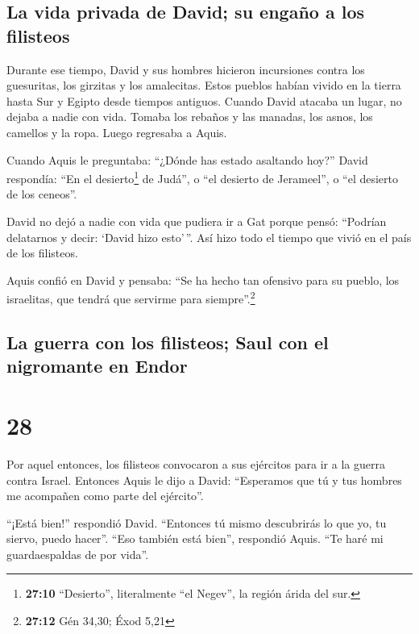 \hypertarget{la-vida-privada-de-david-su-engauxf1o-a-los-filisteos}{%
\subsection{La vida privada de David; su engaño a los
filisteos}\label{la-vida-privada-de-david-su-engauxf1o-a-los-filisteos}}

 Durante ese tiempo, David y sus hombres hicieron
incursiones contra los guesuritas, los girzitas y los amalecitas. Estos
pueblos habían vivido en la tierra hasta Sur y Egipto desde tiempos
antiguos.  Cuando David atacaba un lugar, no dejaba a
nadie con vida. Tomaba los rebaños y las manadas, los asnos, los
camellos y la ropa. Luego regresaba a Aquis.

 Cuando Aquis le preguntaba: ``¿Dónde has estado
asaltando hoy?'' David respondía: ``En el desierto\footnote{\textbf{27:10}
  ``Desierto'', literalmente ``el Negev'', la región árida del sur.} de
Judá'', o ``el desierto de Jerameel'', o ``el desierto de los ceneos''.

 David no dejó a nadie con vida que pudiera ir a Gat
porque pensó: ``Podrían delatarnos y decir: `David hizo esto'\,''. Así
hizo todo el tiempo que vivió en el país de los filisteos.

 Aquis confió en David y pensaba: ``Se ha hecho tan
ofensivo para su pueblo, los israelitas, que tendrá que servirme para
siempre''.\footnote{\textbf{27:12} Gén 34,30; Éxod 5,21}

\hypertarget{la-guerra-con-los-filisteos-saul-con-el-nigromante-en-endor}{%
\subsection{La guerra con los filisteos; Saul con el nigromante en
Endor}\label{la-guerra-con-los-filisteos-saul-con-el-nigromante-en-endor}}

\hypertarget{section-27}{%
\section{28}\label{section-27}}

 Por aquel entonces, los filisteos convocaron a sus
ejércitos para ir a la guerra contra Israel. Entonces Aquis le dijo a
David: ``Esperamos que tú y tus hombres me acompañen como parte del
ejército''.

 ``¡Está bien!'' respondió David. ``Entonces tú mismo
descubrirás lo que yo, tu siervo, puedo hacer''. ``Eso también está
bien'', respondió Aquis. ``Te haré mi guardaespaldas de por vida''.

